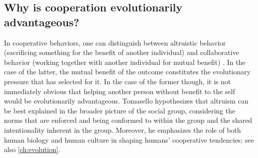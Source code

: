 \subsection{Why is cooperation evolutionarily advantageous?}

In cooperative behaviors, one can distinguish between altruistic behavior (sacrificing something for the benefit of another individual) and collaborative behavior (working together with another individual for mutual benefit) \citep{Tomasello09}. In the case of the latter, the mutual benefit of the outcome constitutes the evolutionary pressure that has selected for it. In the case of the former though, it is not immediately obvious that helping another person without benefit to the self would be evolutionarily advantageous. Tomasello hypothesizes that altruism can be best explained in the broader picture of the social group, considering the norms that are enforced and being conformed to within the group and the shared intentionality inherent in the group.
Moreover, he emphasizes the role of both human biology and human culture in shaping humans' cooperative tendencies; see also \cref{ch:evolution}.

